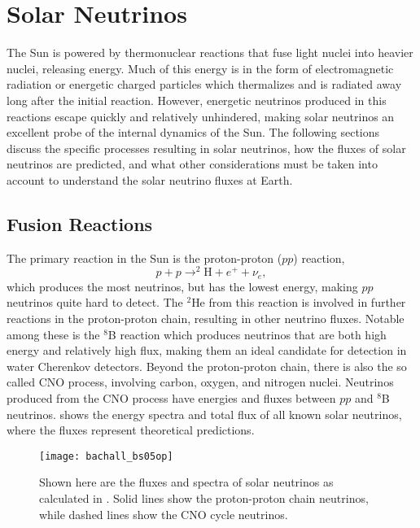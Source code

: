 \section{Solar Neutrinos}

The Sun is powered by thermonuclear reactions that fuse light nuclei into heavier nuclei, releasing energy.
Much of this energy is in the form of electromagnetic radiation or energetic charged particles which thermalizes and is radiated away long after the initial reaction.
However, energetic neutrinos produced in this reactions escape quickly and relatively unhindered, making solar neutrinos an excellent probe of the internal dynamics of the Sun.
The following sections discuss the specific processes resulting in solar neutrinos, how the fluxes of solar neutrinos are predicted, and what other considerations must be taken into account to understand the solar neutrino fluxes at Earth.

\subsection{Fusion Reactions}

The primary reaction in the Sun is the proton-proton ($pp$) reaction,
\begin{equation}
p+p \rightarrow ^2\mathrm{H}+e^++\nu_e,
\end{equation}
which produces the most neutrinos, but has the lowest energy, making $pp$ neutrinos quite hard to detect.
The $^2$He from this reaction is involved in further reactions in the proton-proton chain, resulting in other neutrino fluxes.
Notable among these is the $^8$B reaction which produces neutrinos that are both high energy and relatively high flux, making them an ideal candidate for detection in water Cherenkov detectors.
Beyond the proton-proton chain, there is also the so called CNO process, involving carbon, oxygen, and nitrogen nuclei. 
Neutrinos produced from the CNO process have energies and fluxes between $pp$ and $^8$B neutrinos.
 shows the energy spectra and total flux of all known solar neutrinos, where the fluxes represent theoretical predictions.

\begin{figure}
\centering
\texttt{[image: bachall\_bs05op]}
\caption{\label{neutrino_spectra}Shown here are the fluxes and spectra of solar neutrinos as calculated in \cite{bs05op}.
    Solid lines show the proton-proton chain neutrinos, while dashed lines show the CNO cycle neutrinos.}
\end{figure}

